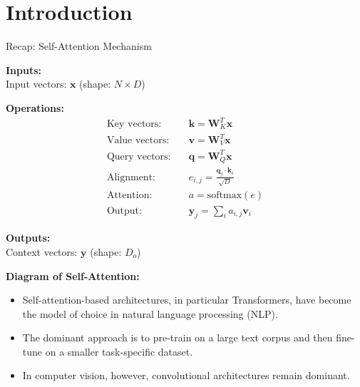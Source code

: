 \section{Introduction}

\begin{frame}{Recap: Self-Attention Mechanism}

\textbf{Inputs:}\\
Input vectors: $\mathbf{x}$ (shape: $N \times D$)

\vspace{0.5cm}

\textbf{Operations:}
\begin{align*}
\text{Key vectors:} & \quad \mathbf{k} = \mathbf{W}_K^T \mathbf{x} \\
\text{Value vectors:} & \quad \mathbf{v} = \mathbf{W}_V^T \mathbf{x} \\
\text{Query vectors:} & \quad \mathbf{q} = \mathbf{W}_Q^T \mathbf{x} \\
\text{Alignment:} & \quad e_{i,j} = \frac{\mathbf{q}_j \cdot \mathbf{k}_i}{\sqrt{D}} \\
\text{Attention:} & \quad a = \text{softmax}(e) \\
\text{Output:} & \quad \mathbf{y}_j = \sum_i a_{i,j} \mathbf{v}_i
\end{align*}

\vspace{0.5cm}

\textbf{Outputs:}\\
Context vectors: $\mathbf{y}$ (shape: $D_o$)

\vspace{0.5cm}

\textbf{Diagram of Self-Attention:}


\end{frame}

\begin{frame}{}
    \begin{itemize}%
        \item Self-attention-based architectures, in particular Transformers, have become the model of choice in natural language processing (NLP).
        \item The dominant approach is to pre-train on a large text corpus and then fine-tune on a smaller task-specific dataset.
        \item In computer vision, however, convolutional architectures remain dominant.
    \end{itemize}
\end{frame}

